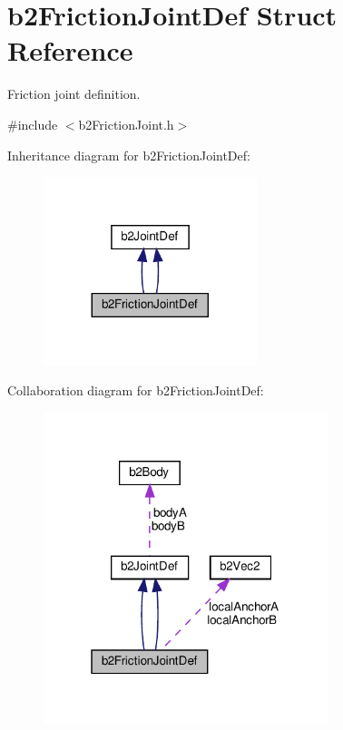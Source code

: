 \hypertarget{structb2FrictionJointDef}{}\section{b2\+Friction\+Joint\+Def Struct Reference}
\label{structb2FrictionJointDef}


Friction joint definition.  




{\ttfamily \#include $<$b2\+Friction\+Joint.\+h$>$}



Inheritance diagram for b2\+Friction\+Joint\+Def\+:
\nopagebreak
\begin{figure}[H]
\begin{center}
\leavevmode
\includegraphics[width=176pt]{structb2FrictionJointDef__inherit__graph}
\end{center}
\end{figure}


Collaboration diagram for b2\+Friction\+Joint\+Def\+:
\nopagebreak
\begin{figure}[H]
\begin{center}
\leavevmode
\includegraphics[width=235pt]{structb2FrictionJointDef__coll__graph}
\end{center}
\end{figure}
